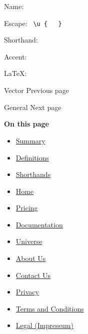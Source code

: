{ }

\subsubsection{\texorpdfstring{{ }}{ }}\label{section-1}

Name: \texttt{\ }


Escape: \texttt{\ \textbackslash{}u\ \{\ }{\texttt{\ }}\texttt{\ \}\ }


Shorthand: \texttt{\ }

{ }

Accent:


LaTeX: \texttt{\ }

{ }

\href{/docs/reference/math/vec/}{\pandocbounded{}}

{ Vector } { Previous page }

\href{/docs/reference/symbols/sym/}{\pandocbounded{}}

{ General } { Next page }

\textbf{On this page}

\begin{itemize}
\tightlist
\item
  \hyperref[summary]{Summary}
\item
  \hyperref[definitions]{Definitions}
\item
  \hyperref[shorthands]{Shorthands}
\end{itemize}

\begin{itemize}
\tightlist
\item
  \href{/}{Home}
\item
  \href{/pricing/}{Pricing}
\item
  \href{/docs/}{Documentation}
\item
  \href{/universe/}{Universe}
\item
  \href{/about/}{About Us}
\item
  \href{/contact/}{Contact Us}
\item
  \href{/privacy/}{Privacy}
\item
  \href{https://typst.app/terms}{Terms and Conditions}
\item
  \href{/legal/}{Legal (Impressum)}
\end{itemize}

